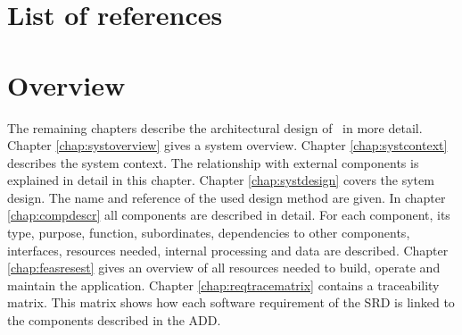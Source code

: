 \section{List of references}


\section{Overview}
The remaining chapters describe the architectural design of \projectname\ in more detail. Chapter \ref{chap:systoverview} gives a system overview. Chapter \ref{chap:systcontext} describes the system context. The relationship with external components is explained in detail in this chapter. Chapter \ref{chap:systdesign} covers the sytem design. The name and reference of the used design method are given.
In chapter \ref{chap:compdescr} all components are described in detail. For each component, its type, purpose, function, subordinates, dependencies to other components, interfaces, resources needed, internal processing and  data are described. Chapter \ref{chap:feasresest} gives an overview of all resources needed to build, operate and maintain the application. Chapter \ref{chap:reqtracematrix} contains a traceability matrix. This matrix shows how each software requirement of the SRD \cite{srd} is linked to the components described in the ADD.